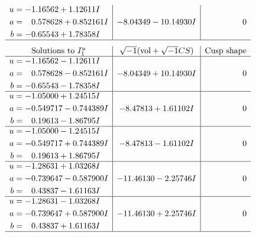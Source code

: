 \documentclass[1p]{elsarticle_modified}
\theoremstyle{definition}
\newcommand{\I}{\sqrt{-1}}
\begin{document}
$$\begin{array}{c|c|c}
\begin{aligned}
u &= -1.16562 + 1.12611 I \\
a &= \phantom{-}0.578628 + 0.852161 I \\
b &= -0.65543 + 1.78358 I\end{aligned}
 & -8.04349 - 10.14930 I & \phantom{-0.000000 } 0\\
 \hline 
 \end{array}$$\newpage$$\begin{array}{c|c|c}  
\text{Solutions to }I^u_{1}& \I (\text{vol} + \sqrt{-1}CS) & \text{Cusp shape}\\
 \hline 
\begin{aligned}
u &= -1.16562 - 1.12611 I \\
a &= \phantom{-}0.578628 - 0.852161 I \\
b &= -0.65543 - 1.78358 I\end{aligned}
 & -8.04349 + 10.14930 I & \phantom{-0.000000 } 0 \\ \hline\begin{aligned}
u &= -1.05000 + 1.24515 I \\
a &= -0.549717 - 0.744389 I \\
b &= \phantom{-}0.19613 - 1.86795 I\end{aligned}
 & -8.47813 + 1.61102 I & \phantom{-0.000000 } 0 \\ \hline\begin{aligned}
u &= -1.05000 - 1.24515 I \\
a &= -0.549717 + 0.744389 I \\
b &= \phantom{-}0.19613 + 1.86795 I\end{aligned}
 & -8.47813 - 1.61102 I & \phantom{-0.000000 } 0 \\ \hline\begin{aligned}
u &= -1.28631 + 1.03268 I \\
a &= -0.739647 - 0.587900 I \\
b &= \phantom{-}0.43837 - 1.61163 I\end{aligned}
 & -11.46130 - 2.25746 I & \phantom{-0.000000 } 0 \\ \hline\begin{aligned}
u &= -1.28631 - 1.03268 I \\
a &= -0.739647 + 0.587900 I \\
b &= \phantom{-}0.43837 + 1.61163 I\end{aligned}
 & -11.46130 + 2.25746 I & \phantom{-0.000000 } 0\\
 \hline 
 \end{array}$$\newpage\newpage\renewcommand{\arraystretch}{1}
\end{document}
